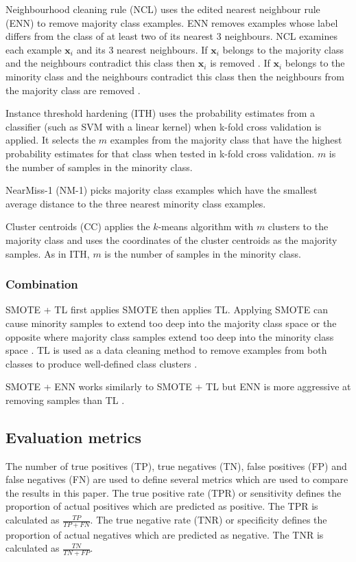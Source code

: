 \documentclass{sig-alternate-05-2015}
\begin{document}
	Neighbourhood cleaning rule (NCL) \cite{Laurikkala:2001:IID:648155.757340} uses the edited nearest neighbour rule (ENN) to remove majority class examples. ENN removes examples whose label differs from the class of at least two of its nearest 3 neighbours. NCL examines each example $\textbf{x}_i$ and its 3 nearest neighbours. If $\textbf{x}_i$ belongs to the majority class and the neighbours contradict this class then $\textbf{x}_i$ is removed \cite{Batista:2004:SBS:1007730.1007735}. If $\textbf{x}_i$ belongs to the minority class and the neighbours contradict this class then the neighbours from the majority class are removed \cite{Batista:2004:SBS:1007730.1007735}.
	
	Instance threshold hardening (ITH) \cite{Smith:2014:ILA:2843614.2843686} uses the probability estimates from a classifier (such as SVM with a linear kernel) when k-fold cross validation is applied. It selects the $m$ examples from the majority class that have the highest probability estimates for that class when tested in k-fold cross validation. $m$ is the number of samples in the minority class.
	
	NearMiss-1 (NM-1) \cite{mani2003knn} picks majority class examples which have the smallest average distance to the three nearest minority class examples.
	
	Cluster centroids (CC) applies the $k$-means algorithm with $m$ clusters to the majority class and uses the coordinates of the cluster centroids as the majority samples. As in ITH, $m$ is the number of samples in the minority class.	
	
	\subsubsection{Combination}
	SMOTE + TL \cite{batista2003balancing} first applies SMOTE then applies TL. Applying SMOTE can cause minority samples to extend too deep into the majority class space or the opposite where majority class samples extend too deep into the minority class space \cite{batista2003balancing}. TL is used as a data cleaning method to remove examples from both classes to produce well-defined class clusters \cite{batista2003balancing}.
	
	SMOTE + ENN works similarly to SMOTE + TL but ENN is more aggressive at removing samples than TL \cite{Batista:2004:SBS:1007730.1007735}.
	
	\subsection{Evaluation metrics}
	The number of true positives (TP), true negatives (TN), false positives (FP) and false negatives (FN) are used to define several metrics which are used to compare the results in this paper. The true positive rate (TPR) or sensitivity defines the proportion of actual positives which are predicted as positive. The TPR is calculated as $\frac{TP}{TP + FN}$. The true negative rate (TNR) or specificity defines the proportion of actual negatives which are predicted as negative. The TNR is calculated as $\frac{TN}{TN + FP}$. 
	
\end{document}

